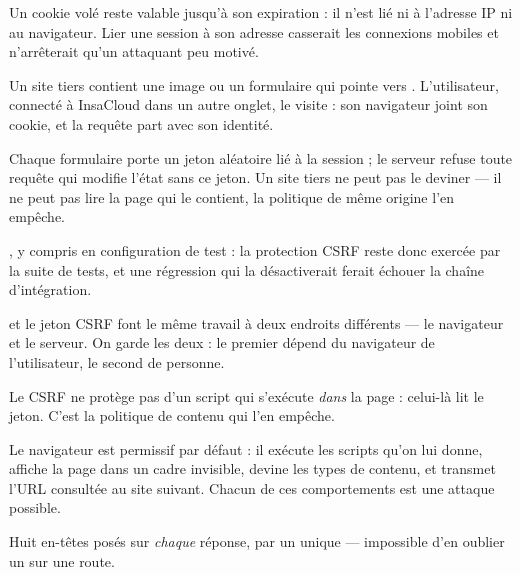 \limite
Un cookie volé reste valable jusqu'à son expiration : il n'est lié ni à
l'adresse IP ni au navigateur. Lier une session à son adresse casserait les
connexions mobiles et n'arrêterait qu'un attaquant peu motivé.


\menace
Un site tiers contient une image ou un formulaire qui pointe vers
. L'utilisateur, connecté à InsaCloud dans un
autre onglet, le visite : son navigateur joint son cookie, et la requête
part avec son identité.

\parade
Chaque formulaire porte un jeton aléatoire lié à la session ; le serveur refuse
toute requête qui modifie l'état sans ce jeton. Un site tiers ne peut pas le
deviner --- il ne peut pas lire la page qui le contient, la politique de même
origine l'en empêche.

\danslecode
{}, y compris en configuration de test : la
protection CSRF reste donc exercée par la suite de tests, et une régression qui
la désactiverait ferait échouer la chaîne d'intégration.

\begin{retenir}
 et le jeton CSRF font le même travail à deux endroits
différents --- le navigateur et le serveur. On garde les deux : le premier
dépend du navigateur de l'utilisateur, le second de personne.
\end{retenir}

\limite
Le CSRF ne protège pas d'un script qui s'exécute \emph{dans} la page : celui-là
lit le jeton. C'est la politique de contenu qui l'en empêche.


\menace
Le navigateur est permissif par défaut : il exécute les scripts qu'on lui
donne, affiche la page dans un cadre invisible, devine les types de contenu,
et transmet l'URL consultée au site suivant. Chacun de ces comportements est
une attaque possible.

\parade
Huit en-têtes posés sur \emph{chaque} réponse, par un 
unique --- impossible d'en oublier un sur une route.

